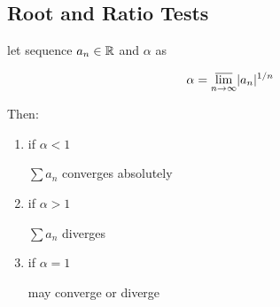 \subsection{Root and Ratio Tests}

\begin{thm}
    \label{thm:thm-root-test}
    let sequence $a_n \in \mathbb{R}$ and $\alpha$ as

    \[
        \alpha = \varlimsup_{n \to \infty} \lvert a_n\rvert^{1/n}
    \]

    Then:

    \begin{enumerate}
        \item if $\alpha < 1$

        $\sum a_n$ converges absolutely

        \item if $\alpha > 1$

        $\sum a_n$ diverges


        \item if $\alpha = 1$

        may converge or diverge
    \end{enumerate}
\end{thm}

